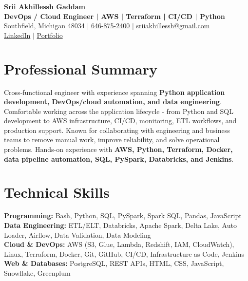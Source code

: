 \documentclass[letterpaper,10pt]{article}
\begin{document}
\fontsize{9.35pt}{10.45pt}\selectfont

\begin{center}
    {\LARGE \textbf{Srii Akhillessh Gaddam}} \\[-1pt]
    \textbf{DevOps / Cloud Engineer | AWS | Terraform | CI/CD | Python} \\[2pt]
    Southfield, Michigan 48034 $|$
    \href{tel:6468752400}{646-875-2400} $|$
    \href{mailto:sriiakhillessh@gmail.com}{sriiakhillessh@gmail.com} \\[1pt]
    \href{https://www.linkedin.com/in/srii-akhiilessh-gaddam-b48668191/}{LinkedIn} $|$
    \href{https://sriiakhillesshg.github.io/portfolio/}{Portfolio}
\end{center}
\vspace{-8pt}

\section{Professional Summary}
\small{Cross-functional engineer with experience spanning \textbf{Python application development, DevOps/cloud automation, and data engineering}. Comfortable working across the application lifecycle - from Python and SQL development to AWS infrastructure, CI/CD, monitoring, ETL workflows, and production support. Known for collaborating with engineering and business teams to remove manual work, improve reliability, and solve operational problems. Hands-on experience with \textbf{AWS, Python, Terraform, Docker, data pipeline automation, SQL, PySpark, Databricks, and Jenkins}.}

\section{Technical Skills}
\small{
\textbf{Programming:} Bash, Python, SQL, PySpark, Spark SQL, Pandas, JavaScript \\
\textbf{Data Engineering:} ETL/ELT, Databricks, Apache Spark, Delta Lake, Auto Loader, Airflow, Data Validation, Data Modeling \\
\textbf{Cloud \& DevOps:} AWS (S3, Glue, Lambda, Redshift, IAM, CloudWatch), Linux, Terraform, Docker, Git, GitHub, CI/CD, Infrastructure as Code, Jenkins \\
\textbf{Web \& Databases:} PostgreSQL, REST APIs, HTML, CSS, JavaScript, Snowflake, Greenplum
}
\end{document}
